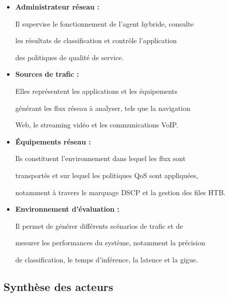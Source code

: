 \begin{itemize}

    \item \textbf{Administrateur réseau :}

    Il supervise le fonctionnement de l'agent hybride, consulte

    les résultats de classification et contrôle l'application

    des politiques de qualité de service.



    \item \textbf{Sources de trafic :}

    Elles représentent les applications et les équipements

    générant les flux réseau à analyser, tels que la navigation

    Web, le streaming vidéo et les communications VoIP.



    \item \textbf{Équipements réseau :}

    Ils constituent l'environnement dans lequel les flux sont

    transportés et sur lequel les politiques QoS sont appliquées,

    notamment à travers le marquage DSCP et la gestion des files HTB.



    \item \textbf{Environnement d'évaluation :}

    Il permet de générer différents scénarios de trafic et de

    mesurer les performances du système, notamment la précision

    de classification, le temps d'inférence, la latence et la gigue.

\end{itemize}



\subsection{Synthèse des acteurs}



